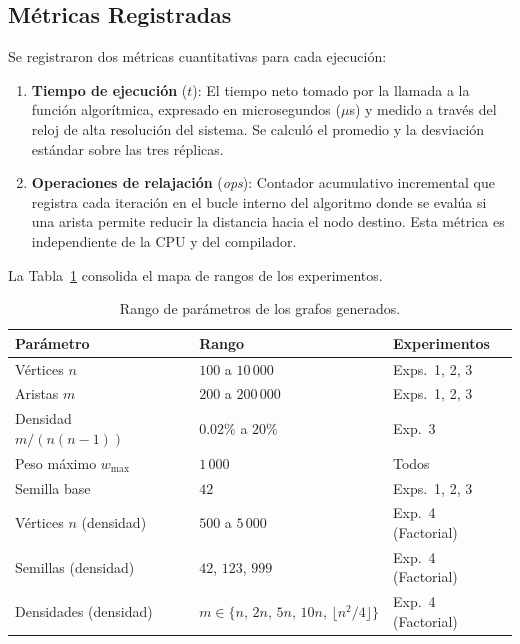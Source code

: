 \documentclass[conference]{IEEEtran}
\begin{document}
\subsection{Métricas Registradas}

Se registraron dos métricas cuantitativas para cada ejecución:
\begin{enumerate}
    \item \textbf{Tiempo de ejecución} ($t$): El tiempo neto tomado por la llamada a la función algorítmica, expresado en microsegundos ($\mu$s) y medido a través del reloj de alta resolución del sistema. Se calculó el promedio y la desviación estándar sobre las tres réplicas.
    \item \textbf{Operaciones de relajación} (\textit{ops}): Contador acumulativo incremental que registra cada iteración en el bucle interno del algoritmo donde se evalúa si una arista permite reducir la distancia hacia el nodo destino. Esta métrica es independiente de la CPU y del compilador.
\end{enumerate}

La Tabla~\ref{tab:rangos} consolida el mapa de rangos de los experimentos.

\begin{table}[H]
  \centering
  \caption{Rango de parámetros de los grafos generados.}
  \label{tab:rangos}
  \begin{tabular}{lll}
    \toprule
    \textbf{Parámetro} & \textbf{Rango} & \textbf{Experimentos} \\
    \midrule
    Vértices $n$           & $100$ a $10\,000$          & Exps.\ 1, 2, 3 \\
    Aristas $m$            & $200$ a $200\,000$         & Exps.\ 1, 2, 3 \\
    Densidad $m/(n(n-1))$  & $0.02\%$ a $20\%$         & Exp.\ 3 \\
    Peso máximo $w_{\max}$ & $1\,000$                   & Todos \\
    Semilla base           & $42$                       & Exps.\ 1, 2, 3 \\
    \midrule
    Vértices $n$ (densidad)  & $500$ a $5\,000$         & Exp.\ 4 (Factorial) \\
    Semillas (densidad)      & $42$, $123$, $999$       & Exp.\ 4 (Factorial) \\
    Densidades (densidad)    & $m \in \{n,\,2n,\,5n,\,10n,\,\lfloor n^2/4\rfloor\}$
                             & Exp.\ 4 (Factorial) \\
    \bottomrule
  \end{tabular}
\end{table}
\end{document}
